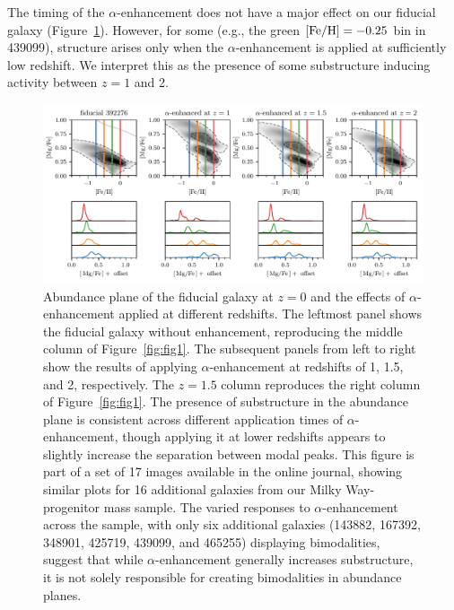 \begin{appendices}
The timing of the $\alpha$-enhancement does not have a major effect on our fiducial galaxy (Figure~\ref{fig:app0}). However, for some (e.g., the green $[\textrm{Fe}/\textrm{H}]=-0.25$ bin in 439099), structure arises only when the $\alpha$-enhancement is applied at sufficiently low redshift. We interpret this as the presence of some substructure inducing activity between $z=1$ and 2.

\begin{figure}
  \centering
  \includegraphics[width=\textwidth]{ch4/app_392276.pdf}
  \caption{Abundance plane of the fiducial galaxy at $z=0$ and the effects of $\alpha$-enhancement applied at different redshifts. The leftmost panel shows the fiducial galaxy without enhancement, reproducing the middle column of Figure~\ref{fig:fig1}. The subsequent panels from left to right show the results of applying $\alpha$-enhancement at redshifts of 1, 1.5, and 2, respectively. The $z=1.5$ column reproduces the right column of Figure~\ref{fig:fig1}. The presence of substructure in the abundance plane is consistent across different application times of $\alpha$-enhancement, though applying it at lower redshifts appears to slightly increase the separation between modal peaks. This figure is part of a set of 17 images available in the online journal, showing similar plots for 16 additional galaxies from our Milky Way-progenitor mass sample. The varied responses to $\alpha$-enhancement across the sample, with only six additional galaxies (143882, 167392, 348901, 425719, 439099, and 465255) displaying bimodalities, suggest that while $\alpha$-enhancement generally increases substructure, it is not solely responsible for creating bimodalities in abundance planes.}
  \label{fig:app0}
\end{figure}


\end{appendices}
